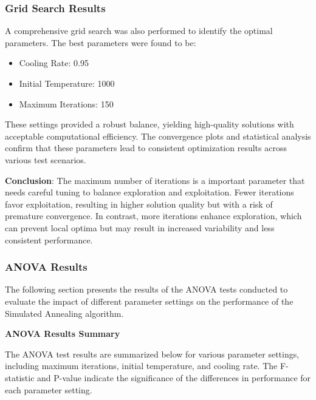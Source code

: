 \documentclass{article}
\begin{document}
    \subsubsection{Grid Search Results}
    A comprehensive grid search was also performed to identify the optimal parameters. The best parameters were found to be:
    \begin{itemize}
        \item Cooling Rate: 0.95
        \item Initial Temperature: 1000
        \item Maximum Iterations: 150
    \end{itemize}
    These settings provided a robust balance, yielding high-quality solutions with acceptable computational efficiency. The convergence plots and statistical analysis confirm that these parameters lead to consistent optimization results across various test scenarios.

    \textbf{Conclusion}: The maximum number of iterations is a important parameter that needs careful tuning to balance exploration and exploitation. Fewer iterations favor exploitation, resulting in higher solution quality but with a risk of premature convergence. In contrast, more iterations enhance exploration, which can prevent local optima but may result in increased variability and less consistent performance.

    \subsubsection{ANOVA Results}

    The following section presents the results of the ANOVA tests conducted to evaluate the impact of different parameter settings on the performance of the Simulated Annealing algorithm.

    \textbf{ANOVA Results Summary}

    The ANOVA test results are summarized below for various parameter settings, including maximum iterations, initial temperature, and cooling rate. The F-statistic and P-value indicate the significance of the differences in performance for each parameter setting.
\end{document}
